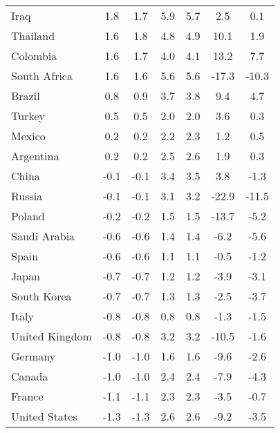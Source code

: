 \begin{tabular}[t]{lcccccc}
Iraq & 1.8 & 1.7 & 5.9 & 5.7 & 2.5 & 0.1\\
Thailand & 1.6 & 1.8 & 4.8 & 4.9 & 10.1 & 1.9\\
Colombia & 1.6 & 1.7 & 4.0 & 4.1 & 13.2 & 7.7\\
South Africa & 1.6 & 1.6 & 5.6 & 5.6 & -17.3 & -10.3\\
Brazil & 0.8 & 0.9 & 3.7 & 3.8 & 9.4 & 4.7\\
Turkey & 0.5 & 0.5 & 2.0 & 2.0 & 3.6 & 0.3\\
Mexico & 0.2 & 0.2 & 2.2 & 2.3 & 1.2 & 0.5\\
Argentina & 0.2 & 0.2 & 2.5 & 2.6 & 1.9 & 0.3\\
China & -0.1 & -0.1 & 3.4 & 3.5 & 3.8 & -1.3\\
Russia & -0.1 & -0.1 & 3.1 & 3.2 & -22.9 & -11.5\\
Poland & -0.2 & -0.2 & 1.5 & 1.5 & -13.7 & -5.2\\
Saudi Arabia & -0.6 & -0.6 & 1.4 & 1.4 & -6.2 & -5.6\\
Spain & -0.6 & -0.6 & 1.1 & 1.1 & -0.5 & -1.2\\
Japan & -0.7 & -0.7 & 1.2 & 1.2 & -3.9 & -3.1\\
South Korea & -0.7 & -0.7 & 1.3 & 1.3 & -2.5 & -3.7\\
Italy & -0.8 & -0.8 & 0.8 & 0.8 & -1.3 & -1.5\\
United Kingdom & -0.8 & -0.8 & 3.2 & 3.2 & -10.5 & -1.6\\
Germany & -1.0 & -1.0 & 1.6 & 1.6 & -9.6 & -2.6\\
Canada & -1.0 & -1.0 & 2.4 & 2.4 & -7.9 & -4.3\\
France & -1.1 & -1.1 & 2.3 & 2.3 & -3.5 & -0.7\\
United States & -1.3 & -1.3 & 2.6 & 2.6 & -9.2 & -3.5\\
\bottomrule
\end{tabular}